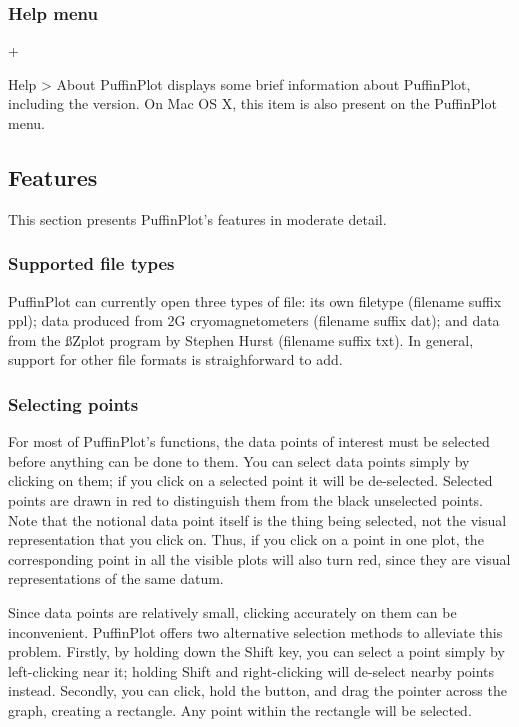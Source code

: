 \documentclass[a4paper,british]{article}
\newcommand{\menuitemlabel}[1]{%
\mbox{\textsf{#1}}\hfil}
\newenvironment{menuitemlist}%
{\begin{list}{}{%
\renewcommand{\makelabel}{\menuitemlabel}%
\setlength{\labelwidth}{35pt}%
\setlength{\leftmargin}%
             {\labelwidth+\labelsep}}}%
{\end{list}}
\newcommand{\ppcmd}[1]{\textsf{#1}} %
\newcommand{\caps}[1]{\MakeTextUppercase{#1}} %
\newcommand{\submenu}{ \textgreater{} } %
\begin{document}
\subsubsection{Help menu}

\begin{menuitemlist}

\item[Help\submenu About PuffinPlot] displays some brief information
about PuffinPlot, including the version. On Mac OS X, this item is
also present on the \ppcmd{PuffinPlot} menu.

\end{menuitemlist}

\subsection{Features}

This section presents PuffinPlot's features in moderate detail.

\subsubsection{\label{sec:file-types}Supported file types}

PuffinPlot can currently open three types of file: its own filetype (filename
suffix \ppcmd{ppl}); data produced from 2\caps{g} cryomagnetometers (filename
suffix \ppcmd{dat}); and data from the {\ss Zplot} program by Stephen Hurst
(filename suffix \ppcmd{txt}). In general, support for other file formats is
straighforward to add.

\subsubsection{Selecting points}

For most of PuffinPlot's functions, the data points of interest must be
selected before anything can be done to them. You can select data points
simply by clicking on them; if you click on a selected point it will be
de-selected. Selected points are drawn in red to distinguish them from the
black unselected points. Note that the notional data point itself is the
thing being selected, not the visual representation that you click on. Thus,
if you click on a point in one plot, the corresponding point in all the
visible plots will also turn red, since they are visual representations of
the same datum.

Since data points are relatively small, clicking accurately on them can be
inconvenient. PuffinPlot offers two alternative selection methods to
alleviate this problem. Firstly, by holding down the \ppcmd{Shift} key, you
can select a point simply by left-clicking near it; holding \ppcmd{Shift} and
right-clicking will de-select nearby points instead. Secondly, you can click,
hold the button, and drag the pointer across the graph, creating a rectangle.
Any point within the rectangle will be selected.
\end{document}
